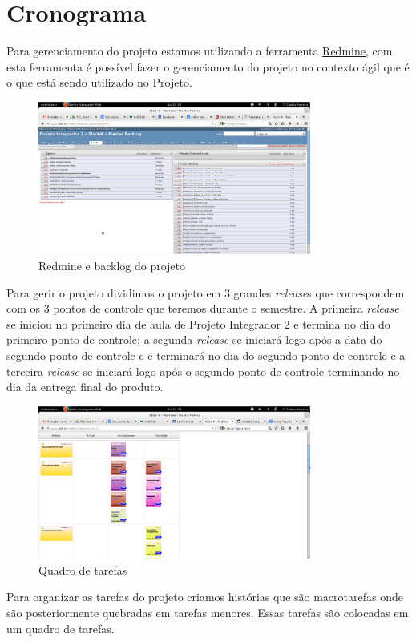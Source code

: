 \chapter[Cronograma]{Cronograma}

Para gerenciamento do projeto estamos utilizando a ferramenta \href{http://lappis.unb.br/redm}{Redmine}, com esta ferramenta é possível fazer o gerenciamento do projeto no contexto ágil que é o que está sendo utilizado no Projeto.

\begin{figure}[h]
  \centering
  \includegraphics[width=0.8\textwidth]
      {figuras/backlogs.eps}
  \caption{Redmine e backlog do projeto}
  \label{redmine-backlog}
\end{figure}

Para gerir o projeto dividimos o projeto em 3 grandes \textit{release}s que correspondem com os 3 pontos de controle que teremos durante o semestre. A primeira \textit{release} se iniciou no primeiro dia de aula de Projeto Integrador 2 e termina no dia do primeiro ponto de controle; a segunda \textit{release} se iniciará logo após a data do segundo ponto de controle e e terminará no dia do segundo ponto de controle e a terceira \textit{release} se iniciará logo após o segundo ponto de controle terminando no dia da entrega final do produto.

\begin{figure}[h]
  \centering
  \includegraphics[width=0.8\textwidth]
      {figuras/quadrotarefas.eps}
  \caption{Quadro de tarefas}
  \label{quadro-de-tarefas}
\end{figure}
Para organizar as tarefas do projeto criamos histórias que são macrotarefas onde são posteriormente quebradas em tarefas menores. Essas tarefas são colocadas em um quadro de tarefas.


  

